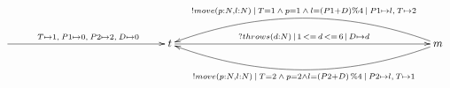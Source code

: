 $\xymatrix{
   \ar[rrrrr]^{\:T\mapsto 1,\:P1\mapsto 0,\:P2\mapsto 2,\:D\mapsto 0} &&&&& {t} \ar[rrrrrrrr]^{?throws(d:N)\,|\,1\,<=\,d\,<=\,6\,|\,D\mapsto d} &&&&&&&& {m} \ar@/_2pc/[llllllll]_{!move(p:N,l:N)\: |\: T=1 \:\land\: p=1 \:\land\: l = (P1+D)\%4\:|\:P1\mapsto l,\:T\mapsto 2} \ar@/^2pc/[llllllll]^{!move(p:N,l:N) \:|\: T=2 \:\land\: p=2 \land l = (P2+D)\,\%4\:|\: P2\mapsto l,\:T\mapsto 1}
}$
